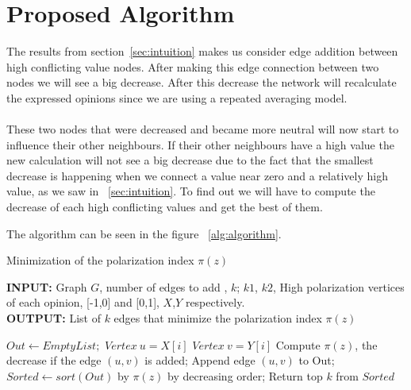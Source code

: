 \section{Proposed Algorithm}
\label{sec:proposedAlgorithm}

The results from section~\ref{sec:intuition} makes us consider edge addition between high conflicting value nodes. After making this edge connection between two nodes we will see a big decrease. After this decrease the network will recalculate the expressed opinions since we are using a repeated averaging model. 
\\
\\
These two nodes that were decreased and became more neutral will now start to influence their other neighbours. If their other neighbours have a high value the new calculation will not see a big decrease due to the fact that the smallest decrease is happening when we connect a value near zero and a relatively high value, as we saw in ~\ref{sec:intuition}. To find out we will have to compute the decrease of each high conflicting values and get the best of them. 

The algorithm can be seen in the figure ~\ref{alg:algorithm}.

\begin{algorithm}[t]
	\caption{Minimization of the polarization index $\pi(z)$}
	\label{alg:algorithm}
	\begin{flushleft}
        		\textbf{INPUT:} Graph $G$, number of edges to add , $k$; $k1$, $k2$, High polarization vertices of each opinion, [-1,0] and [0,1], $X$,$Y$ respectively.\\
        		\textbf{OUTPUT:} List of $k$ edges that minimize the polarization index $\pi(z)$
	\end{flushleft}
	\begin{algorithmic}[1]
		\STATE $Out \leftarrow Empty List;$
		\STATE $Vertex \ u = X[i]$
		\STATE $Vertex \ v = Y[i]$
		\STATE Compute $\pi(z)$, the decrease if the edge $(u,v)$ is added;
		\STATE Append edge $(u,v)$ to Out;
		\ENDFOR
		\ENDFOR
		\STATE $Sorted \leftarrow sort(Out)$ by $\pi(z)$ by decreasing order;
		\STATE Return top $k$ from $Sorted$
	\end{algorithmic}
\end{algorithm}



